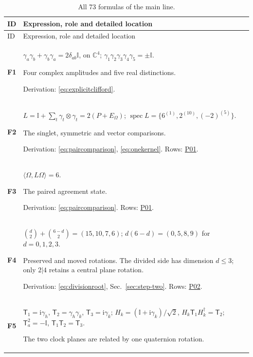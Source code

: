 \documentclass[aps,prx,onecolumn,10pt,notitlepage,nofootinbib,longbibliography]{revtex4-2}
\numberwithin{equation}{section}
\numberwithin{table}{section}
\newcommand{\Id}{\mathbb I}
\newcommand{\CC}{\mathbb C}
\newcommand{\ii}{\mathrm i}
\begin{document}
\begin{longtable}{@{}>{\raggedright\arraybackslash}p{}>{\raggedright\arraybackslash}p{}@{}}
\caption{All 73 formulas of the main line.}\label{tab:formulaindex}\\
\toprule ID&Expression, role and detailed location\\\midrule
\endfirsthead\toprule ID&Expression, role and detailed location\\\midrule
\endhead\bottomrule\endfoot
\hypertarget{formula-F1}{}\textbf{F1}\label{formula:F1} & $\gamma_a\gamma_b+\gamma_b\gamma_a=2\delta_{ab}\Id$, on $\CC^4$; $\gamma_1\gamma_2\gamma_3\gamma_4\gamma_5=\pm\Id$.\par
Four complex amplitudes and five real distinctions.\par
Derivation: \eqref{eq:explicitclifford}. \\[7pt]
\hypertarget{formula-F2}{}\textbf{F2}\label{formula:F2} & $L=\Id+\sum_t\gamma_t\otimes\gamma_t=2(P+E_\Omega)$; $\operatorname{spec}L=\{6^{(1)},2^{(10)},(-2)^{(5)}\}$.\par
The singlet, symmetric and vector comparisons.\par
Derivation: \eqref{eq:paircomparison}, \eqref{eq:onekernel}. Rows: \hyperlink{row-P01}{P01}.\\[7pt]
\hypertarget{formula-F3}{}\textbf{F3}\label{formula:F3} & $\langle\Omega,L\Omega\rangle=6$.\par
The paired agreement state.\par
Derivation: \eqref{eq:paircomparison}. Rows: \hyperlink{row-P01}{P01}.\\[7pt]
\hypertarget{formula-F4}{}\textbf{F4}\label{formula:F4} & $\binom d2+\binom{6-d}2=(15,10,7,6)$; $d(6-d)=(0,5,8,9)$ for $d=0,1,2,3$.\par
Preserved and moved rotations. The divided side has dimension $d\leq3$; only $2|4$ retains a central plane rotation.\par
Derivation: \eqref{eq:divisionroot}, Sec.~\ref{sec:step-two}. Rows: \hyperlink{row-P02}{P02}.\\[7pt]
\hypertarget{formula-F5}{}\textbf{F5}\label{formula:F5} & ${\mathsf T}_1=\ii\gamma_h$, ${\mathsf T}_2=\gamma_h\gamma_k$, ${\mathsf T}_3=\ii\gamma_k$; $H_k=(\Id+\ii\gamma_k)/\sqrt2$, $H_k{\mathsf T}_1H_k^\dagger={\mathsf T}_2$; ${\mathsf T}_a^2=-\Id$, ${\mathsf T}_1{\mathsf T}_2={\mathsf T}_3$.\par
The two clock planes are related by one quaternion rotation.\par

\end{longtable}
\end{document}
